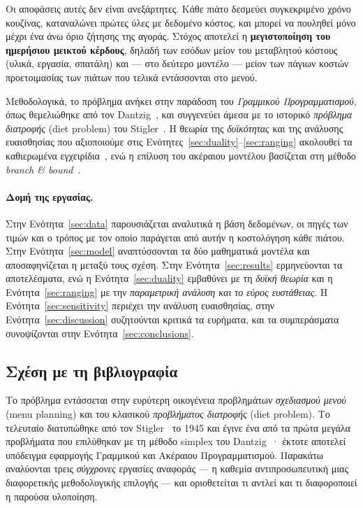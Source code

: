 \documentclass[11pt,a4paper]{article}
\newcommand{\en}[1]{\textenglish{#1}}
\begin{document}
Οι αποφάσεις αυτές δεν είναι ανεξάρτητες. Κάθε πιάτο δεσμεύει συγκεκριμένο χρόνο
κουζίνας, καταναλώνει πρώτες ύλες με δεδομένο κόστος, και μπορεί να πουληθεί μόνο
μέχρι ένα άνω όριο ζήτησης της αγοράς. Στόχος αποτελεί η
\textbf{μεγιστοποίηση του ημερήσιου μεικτού κέρδους}, δηλαδή των εσόδων μείον του
μεταβλητού κόστους (υλικά, εργασία, σπατάλη) και --- στο δεύτερο μοντέλο --- μείον
των πάγιων κοστών προετοιμασίας των πιάτων που τελικά εντάσσονται στο μενού.

Μεθοδολογικά, το πρόβλημα ανήκει στην παράδοση του \emph{Γραμμικού
Προγραμματισμού}, όπως θεμελιώθηκε από τον \en{Dantzig}~\cite{dantzig}, και
συγγενεύει άμεσα με το ιστορικό \emph{πρόβλημα διατροφής} (\en{diet problem}) του
\en{Stigler}~\cite{stigler}. Η θεωρία της \emph{δυϊκότητας} και της ανάλυσης
ευαισθησίας που αξιοποιούμε στις Ενότητες~\ref{sec:duality}--\ref{sec:ranging}
ακολουθεί τα καθιερωμένα εγχειρίδια~\cite{bertsimas,winston}, ενώ η επίλυση του
ακέραιου μοντέλου βασίζεται στη μέθοδο \emph{branch \& bound}~\cite{landdoig,wolsey}.

\paragraph{Δομή της εργασίας.} Στην Ενότητα~\ref{sec:data} παρουσιάζεται αναλυτικά
η βάση δεδομένων, οι πηγές των τιμών και ο τρόπος με τον οποίο παράγεται από αυτήν
η κοστολόγηση κάθε πιάτου. Στην Ενότητα~\ref{sec:model} αναπτύσσονται τα δύο
μαθηματικά μοντέλα και αποσαφηνίζεται η μεταξύ τους σχέση. Στην
Ενότητα~\ref{sec:results} ερμηνεύονται τα αποτελέσματα, ενώ η
Ενότητα~\ref{sec:duality} εμβαθύνει με τη \emph{δυϊκή θεωρία} και η
Ενότητα~\ref{sec:ranging} με την \emph{παραμετρική ανάλυση και το εύρος ευστάθειας}.
Η Ενότητα~\ref{sec:sensitivity} περιέχει την ανάλυση ευαισθησίας, στην
Ενότητα~\ref{sec:discussion} συζητούνται κριτικά τα ευρήματα, και τα συμπεράσματα
συνοψίζονται στην Ενότητα~\ref{sec:conclusions}.

\subsection{Σχέση με τη βιβλιογραφία}\label{sec:literature}
Το πρόβλημα εντάσσεται στην ευρύτερη οικογένεια προβλημάτων \emph{σχεδιασμού μενού}
(\en{menu planning}) και του κλασικού \emph{προβλήματος διατροφής} (\en{diet
problem}). Το τελευταίο διατυπώθηκε από τον \en{Stigler}~\cite{stigler} το 1945 και
έγινε ένα από τα πρώτα μεγάλα προβλήματα που επιλύθηκαν με τη μέθοδο \en{simplex}
του \en{Dantzig}~\cite{dantzig}· έκτοτε αποτελεί υπόδειγμα εφαρμογής Γραμμικού και
Ακέραιου Προγραμματισμού. Παρακάτω αναλύονται τρεις \emph{σύγχρονες} εργασίες
αναφοράς --- η καθεμία αντιπροσωπευτική μιας διαφορετικής μεθοδολογικής επιλογής ---
και οριοθετείται τι αντλεί και τι διαφοροποιεί η παρούσα υλοποίηση.
\end{document}
